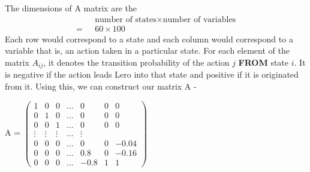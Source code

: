 \documentclass[11pt]{article}
\begin{document}
	The dimensions of A matrix are the 
	\begin{align*}
		& \text{number of states} \times \text{number of variables}  \\
		=\text{  }& 60 \times 100 
	\end{align*}
	Each row would correspond to a state and each column would correspond to a variable that is, an action taken in a particular state. 
	For each element of the matrix $A_{ij}$, it denotes the transition probability of the action $j$ \textbf{FROM} state $i$. It is negative
	if the action leads Lero into that state and positive if it is originated from it.
	Using this, we can construct our matrix A - 
	\begin{center}
		A =
	$ 
	\begin{pmatrix}
		1 & 0 & 0 &\ldots &0&0&0\\
		0 & 1 & 0 &\ldots &0&0&0\\
		0 & 0 & 1 &\ldots &0&0&0\\
		\vdots & \vdots & \vdots & \ldots & \vdots \\
		0 & 0 & 0 &\ldots &0&0&-0.04\\
		0 & 0 & 0 &\ldots &0.8&0&-0.16\\
		0 & 0 & 0 &\ldots &-0.8&1&1
	\end{pmatrix}		
		$
	\end{center}
		
\end{document}
